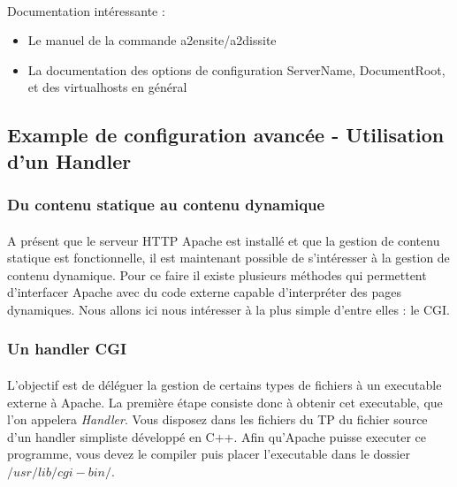 \documentclass[12pt,a4paper]{article}
\begin{document}
\paragraph{}
Documentation intéressante : 
\begin{itemize}
\item Le manuel de la commande a2ensite/a2dissite
\item La documentation des options de configuration ServerName, DocumentRoot, et des virtualhosts en général
\end{itemize}

\subsection{Example de configuration avancée - Utilisation d'un Handler}

\subsubsection{Du contenu statique au contenu dynamique}

\paragraph{}
A présent que le serveur HTTP Apache est installé et que la gestion de contenu statique est fonctionnelle, il est maintenant possible de s'intéresser à la gestion de contenu dynamique. Pour ce faire il existe plusieurs méthodes qui permettent d'interfacer Apache avec du code externe capable d'interpréter des pages dynamiques. Nous allons ici nous intéresser à la plus simple d'entre elles : le CGI.

\subsubsection{Un handler CGI}

\paragraph{}
L'objectif est de déléguer la gestion de certains types de fichiers à un executable externe à Apache. La première étape consiste donc à obtenir cet executable, que l'on appelera \textit{Handler}. Vous disposez dans les fichiers du TP du fichier source d'un handler simpliste développé en C++. Afin qu'Apache puisse executer ce programme, vous devez le compiler puis placer l'executable dans le dossier $/usr/lib/cgi-bin/$.
\end{document}
